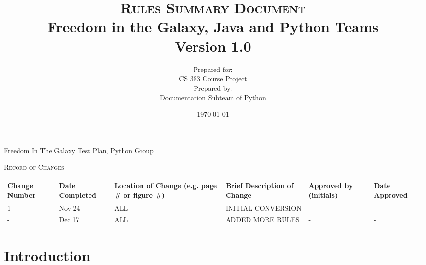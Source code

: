 \documentclass[a4wide]{article}
\begin{document}
\title{\textsc{Rules Summary Document}
  \\ Freedom in the Galaxy, Java and Python Teams
  \vspace{10 mm}
  \\ Version 1.0
  \vspace{10 mm}}
  
\date{\today}

\author{Prepared for:
  \\ CS 383 Course Project
  \vspace{10 mm}
  \\Prepared by:
  \\ Documentation Subteam of Python 
  \vspace{10 mm}}
  
\maketitle
\newpage
  
\begin{center}
\noindent Freedom In The Galaxy Test Plan, Python Group

\vspace{10 mm}

\noindent \textsc{Record of Changes}   

\vspace{10 mm}


\begin{tabularx}{\textwidth}{| X | X | X | X | X | X |}
  \hline
  \textbf{Change Number} &
    \textbf{Date Completed} &
    \textbf{Location of Change (e.g. page \# or figure \#)} &
    \textbf{Brief Description of Change} &
    \textbf{Approved by (initials)} &
    \textbf{Date Approved} 
    \\ \hline 1 & Nov 24 & ALL  & INITIAL CONVERSION & - & -
    \\ \hline - & Dec 17 & ALL & ADDED MORE RULES & - & -
    \\ \hline
\end{tabularx}
\end{center}
\newpage 
\tableofcontents
\newpage

\section{Introduction}
\end{document}
